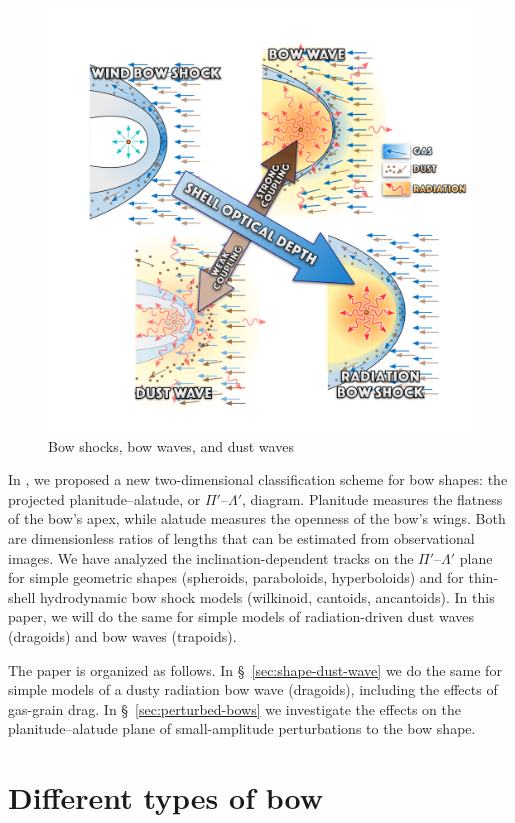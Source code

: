\message{ !name(dusty-bow-wave.tex)}\documentclass[useAMS, usenatbib, a4paper]{mnras}
\newcommand\PaperI{\citetalias{Tarango-Yong:2018a}}
\begin{document}
\begin{figure}
  \centering
  \includegraphics[width=0.8\linewidth]{figs/bows-and-waves}
  \caption{Bow shocks, bow waves, and dust waves}
  \label{fig:3-types-bow}
\end{figure}

In \citet[][hereafter \PaperI{}]{Tarango-Yong:2018a}, we proposed a
new two-dimensional classification scheme for bow shapes: the
projected planitude--alatude, or \(\Pi'\)--\(\Lambda'\), diagram.  Planitude
measures the flatness of the bow's apex, while alatude measures the
openness of the bow's wings.  Both are dimensionless ratios of lengths
that can be estimated from observational images.  We have analyzed the
inclination-dependent tracks on the \(\Pi'\)--\(\Lambda'\) plane for simple
geometric shapes (spheroids, paraboloids, hyperboloids) and for
thin-shell hydrodynamic bow shock models (wilkinoid, cantoids,
ancantoids).  In this paper, we will do the same for simple models of
radiation-driven dust waves (dragoids) and bow waves (trapoids).

The paper is organized as follows.
%
In \S~\ref{sec:shape-dust-wave} we do the same for simple models of a
dusty radiation bow wave (dragoids), including the effects of
gas-grain drag.
%
In \S~\ref{sec:perturbed-bows} we investigate the effects on the
planitude--alatude plane of small-amplitude perturbations to the bow
shape.
%


\section{Different types of bow}
\label{sec:different-types-bow}
\end{document}
